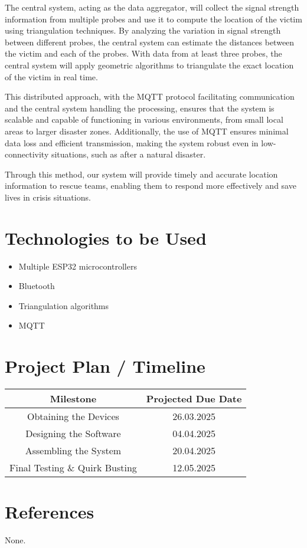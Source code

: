 \documentclass{article}
\begin{document}
The central system, acting as the data aggregator, will collect the signal strength information from multiple probes and use it to compute the location of the victim using triangulation techniques. By analyzing the variation in signal strength between different probes, the central system can estimate the distances between the victim and each of the probes. With data from at least three probes, the central system will apply geometric algorithms to triangulate the exact location of the victim in real time.

This distributed approach, with the MQTT protocol facilitating communication and the central system handling the processing, ensures that the system is scalable and capable of functioning in various environments, from small local areas to larger disaster zones. Additionally, the use of MQTT ensures minimal data loss and efficient transmission, making the system robust even in low-connectivity situations, such as after a natural disaster.

Through this method, our system will provide timely and accurate location information to rescue teams, enabling them to respond more effectively and save lives in crisis situations.

\section{Technologies to be Used}

\begin{itemize}
    \item Multiple ESP32 microcontrollers
    \item Bluetooth
    \item Triangulation algorithms
    \item MQTT
\end{itemize}

\section{Project Plan / Timeline}

\begin{table}[htbp]
    \centering
    \begin{tabular}{|c|c|}
    \hline
    \bf{Milestone} & \bf{Projected Due Date} \\
    \hline
    Obtaining the Devices & 26.03.2025 \\
    \hline
    Designing the Software & 04.04.2025 \\
    \hline
    Assembling the System & 20.04.2025 \\
    \hline
    Final Testing \& Quirk Busting & 12.05.2025 \\
    \hline
    \end{tabular}
\end{table}


\section{References}
None.
\end{document}
